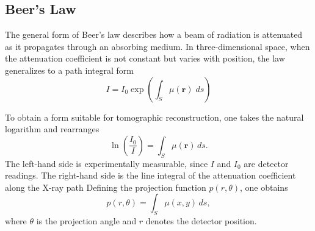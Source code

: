 \documentclass[../../../main.tex]{subfiles}
\begin{document}
\subsection{Beer's Law}
The general form of Beer’s law describes how a beam of radiation is attenuated as it propagates through an absorbing medium.
In three-dimensional space, when the attenuation coefficient is not constant but varies with position, the law generalizes to a path integral form
\begin{equation*}
    I=I_0\exp \left( \int_S \mu(\mathbf{r })\;ds \right)
\end{equation*}

To obtain a form suitable for tomographic reconstruction, one takes the natural logarithm and rearranges
\begin{equation*}
    \ln\!\left(\frac{I_0}{I}\right) = \int_{S} \mu(\mathbf{r}) \, ds.
\end{equation*}
The left-hand side is experimentally measurable, since $I$ and $I_0$ are detector readings.
The right-hand side is the line integral of the attenuation coefficient along the X-ray path
Defining the projection function $p(r,\theta)$, one obtains
\begin{equation*}
    p(r, \theta)    = \int_{S} \mu(x,y) \, ds,
\end{equation*}
where $\theta$ is the projection angle and $r$ denotes the detector position.
\end{document}
